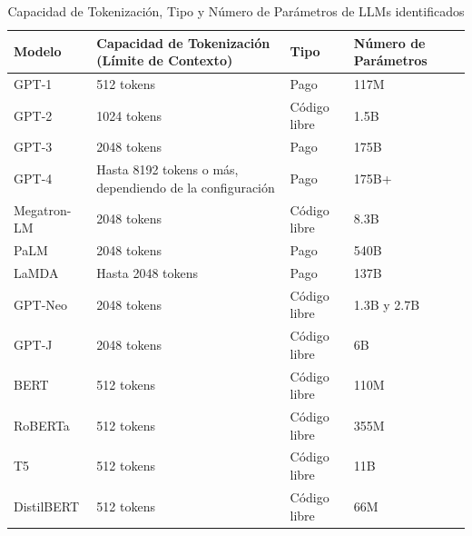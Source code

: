 \documentclass[journal,onecolumn]{IEEEtran}
\begin{document}
\begin{table}[h!]
	\centering
	\begin{tabular}{|l|l|l|l|}
		\hline
		\textbf{Modelo} & \textbf{Capacidad de Tokenización (Límite de Contexto)} & \textbf{Tipo}       & \textbf{Número de Parámetros} \\ \hline
		GPT-1           & 512 tokens                                              & Pago                & 117M                         \\ \hline
		GPT-2           & 1024 tokens                                             & Código libre        & 1.5B                         \\ \hline
		GPT-3           & 2048 tokens                                             & Pago                & 175B                         \\ \hline
		GPT-4           & Hasta 8192 tokens o más, dependiendo de la configuración & Pago                & 175B+                        \\ \hline
		Megatron-LM     & 2048 tokens                                             & Código libre        & 8.3B                         \\ \hline
		PaLM            & 2048 tokens                                             & Pago                & 540B                         \\ \hline
		LaMDA           & Hasta 2048 tokens                                       & Pago                & 137B                         \\ \hline
		GPT-Neo         & 2048 tokens                                             & Código libre        &1.3B y 2.7B                         \\ \hline
		GPT-J           & 2048 tokens                                             & Código libre        & 6B                           \\ \hline
		BERT            & 512 tokens                                              & Código libre        & 110M                         \\ \hline
		RoBERTa         & 512 tokens                                              & Código libre        & 355M                         \\ \hline
		T5              & 512 tokens                                              & Código libre        & 11B                          \\ \hline
		DistilBERT      & 512 tokens                                              & Código libre        & 66M                          \\ \hline
	\end{tabular}
	\caption{Capacidad de Tokenización, Tipo y Número de Parámetros de LLMs identificados}
	\label{tab:tokenization}
\end{table}
\end{document}
